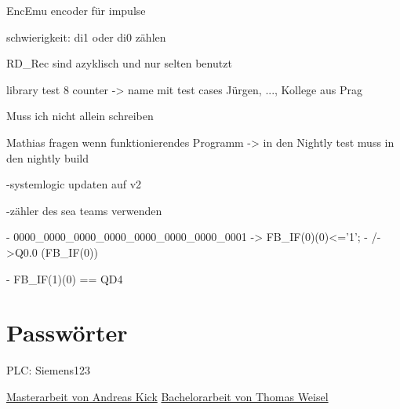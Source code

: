 EncEmu encoder für impulse 

schwierigkeit: di1 oder di0 zählen

RD\_Rec sind azyklisch und nur selten benutzt

library test 8 counter -> name mit test cases Jürgen, ..., Kollege aus Prag

Muss ich nicht allein schreiben

Mathias fragen wenn funktionierendes Programm -> in den Nightly test muss in den nightly build

-systemlogic updaten auf v2 

-zähler des sea teams verwenden

- 0000\_0000\_0000\_0000\_0000\_0000\_0000\_0001 -> FB\_IF(0)(0)<='1';
-    /->Q0.0                          (FB\_IF(0))

- FB\_IF(1)(0) == QD4
\chapter{Passwörter}

PLC: Siemens123

\href{https://siemens.sharepoint.com/teams/P0000045/Backbone/Abschlussarbeiten/Masterarbeit_Andreas_Kick.pdf}{Masterarbeit von Andreas Kick}
\href{https://siemens.sharepoint.com/teams/P0000045/Backbone/Abschlussarbeiten/Bachelorarbeit_Thomas_Weisel.pdf}{Bachelorarbeit von Thomas Weisel}